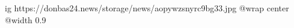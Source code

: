  
 
 
 
 

\ifcmt
  ig https://donbas24.news/storage/news/aopywzsnyrc9bg33.jpg
  @wrap center
  @width 0.9
\fi
